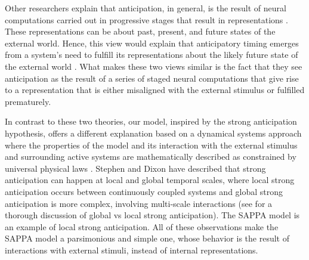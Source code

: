 \documentclass{report}
\begin{document}
Other researchers explain that anticipation, in general, is the result of neural computations carried out in progressive stages that result in representations \cite{clark2008brain}. These representations can be about past, present, and future states of the external world. Hence, this view would explain that anticipatory timing emerges from a system's need to fulfill its representations about the likely future state of the external world \cite{pezzulo2008coordinating}. What makes these two views similar is the fact that they see anticipation as the result of a series of staged neural computations that give rise to a representation that is either misaligned with the external stimulus or fulfilled prematurely.

In contrast to these two theories, our model, inspired by the strong anticipation hypothesis, offers a different explanation based on a dynamical systems approach where the properties of the model and its interaction with the external stimulus and surrounding active systems are mathematically described as constrained by universal physical laws \cite{stepp2010strong}. Stephen and Dixon \cite{stephen2011strong} have described that strong anticipation can happen at local and global temporal scales, where local strong anticipation occurs between continuously coupled systems and global strong anticipation is more complex, involving multi-scale interactions (see \cite{mahmoodi2020dynamical, roume2018windowed} for a thorough discussion of global vs local strong anticipation). The SAPPA model is an example of local strong anticipation. All of these observations make the SAPPA model a parsimonious and simple one, whose behavior is the result of interactions with external stimuli, instead of internal representations.
\end{document}
